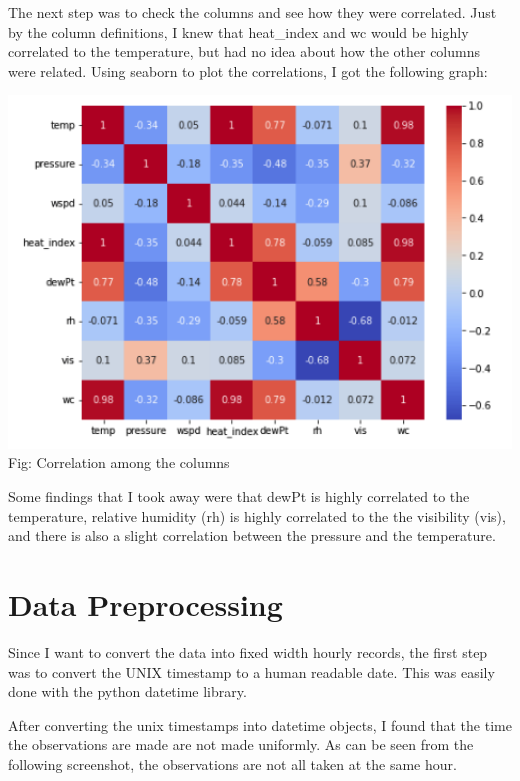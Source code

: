 \documentclass[paper=a4, fontsize=11pt, margin=1in]{scrartcl}
\numberwithin{equation}{section}		%
\numberwithin{figure}{section}			%
\numberwithin{table}{section}				%
\begin{document}
\pagebreak

The next step was to check the columns and see how they were correlated. Just by the column definitions, I knew that heat\_index and wc would be highly correlated to the temperature, but had no idea about how the other columns were related. Using seaborn to plot the correlations, I got the following graph:\\

\begin{center}
\includegraphics[width=1\textwidth,height=0.5\textheight]{correlations.png}
\\
Fig: Correlation among the columns
\end{center}

Some findings that I took away were that dewPt is highly correlated to the temperature, relative humidity (rh) is highly correlated to the the visibility (vis), and there is also a slight correlation between the pressure and the temperature. 

\section{\textbf{Data Preprocessing}}

Since I want to convert the data into fixed width hourly records, the first step was to convert the UNIX timestamp to a human readable date. This was easily done with the python datetime library.

After converting the unix timestamps into datetime objects, I found that the time the observations are made are not made uniformly. As can be seen from the following screenshot, the observations are not all taken at the same hour.
\end{document}
